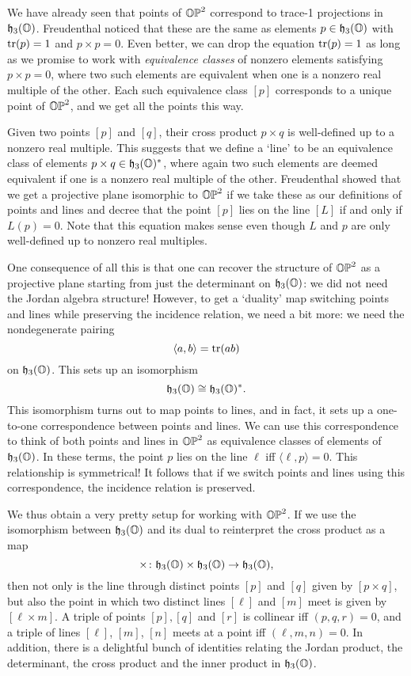 We have already seen that points of ${\mathbb {OP}}^2$ correspond to trace-1
projections in ${\mathfrak {h}}_3({\mathbb O})$.  Freudenthal \cite{Freudenthal} noticed that
these are the same as elements $p \in {\mathfrak {h}}_3({\mathbb O})$ with ${\rm tr}(p) = 1$ and $p
\times p = 0$.    Even better, we can drop the equation ${\rm tr}(p) = 1$ as
long as we promise to work with {\it equivalence classes} of nonzero 
elements satisfying $p \times p = 0$, where two such elements are
equivalent when one is a nonzero real multiple of the other.  Each
such equivalence class $[p]$ corresponds to a unique point of ${\mathbb {OP}}^2$,
and we get all the points this way.

Given two points $[p]$ and $[q]$, their cross product $p \times q$ is
well-defined up to a nonzero real multiple.  This suggests that we define
a `line' to be an equivalence class of elements $p \times q \in
{\mathfrak {h}}_3({\mathbb O})^*$, where again two such elements are deemed equivalent if one
is a nonzero real multiple of the other.   Freudenthal showed that we
get a projective plane isomorphic to ${\mathbb {OP}}^2$ if we take these as our
definitions of points and lines and decree that the point $[p]$ lies on
the line $[L]$ if and only if $L(p) = 0$.   Note that this equation
makes sense even though $L$ and $p$ are only well-defined up to 
nonzero real multiples.

One consequence of all this is that one can recover the structure of
${\mathbb {OP}}^2$ as a projective plane starting from just the determinant on
${\mathfrak {h}}_3({\mathbb O})$: we did not need the Jordan algebra structure!  However, to
get a `duality' map switching points and lines while preserving the
incidence relation, we need a bit more: we need the nondegenerate
pairing 
\[        \langle a,b \rangle =  {\rm tr}(ab)    \]
on ${\mathfrak {h}}_3({\mathbb O})$.  This sets up an isomorphism 
\[        {\mathfrak {h}}_3({\mathbb O}) \cong {\mathfrak {h}}_3({\mathbb O})^* . \]
This isomorphism turns out to map points to lines, and in fact, it sets
up a one-to-one correspondence between points and lines.  We can use
this correspondence to think of both points and lines in ${\mathbb {OP}}^2$ as
equivalence classes of elements of ${\mathfrak {h}}_3({\mathbb O})$.  In these terms, the
point $p$ lies on the line $\ell$ iff $\langle \ell,p \rangle = 0$.  This
relationship is symmetrical!  It follows that if we switch points and
lines using this correspondence, the incidence relation is preserved.

We thus obtain a very pretty setup for working with ${\mathbb {OP}}^2$.  If we
use the isomorphism between ${\mathfrak {h}}_3({\mathbb O})$ and its dual to reinterpret
the cross product as a map 
\[  \times \colon {\mathfrak {h}}_3({\mathbb O}) \times {\mathfrak {h}}_3({\mathbb O}) \to {\mathfrak {h}}_3({\mathbb O}) ,\]
then not only is the line through distinct points $[p]$ and $[q]$ given
by $[p \times q]$, but also the point in which two distinct lines
$[\ell]$ and $[m]$ meet is given by $[\ell \times m]$.  A 
triple of points $[p], [q]$ and $[r]$ is collinear iff $(p,q,r) = 0$,
and a triple of lines $[\ell]$, $[m]$, $[n]$ meets at a point iff
$(\ell,m,n) = 0$.  In addition, there is a delightful bunch of
identities relating the Jordan product, the determinant, the cross
product and the inner product in ${\mathfrak {h}}_3({\mathbb O})$.  


